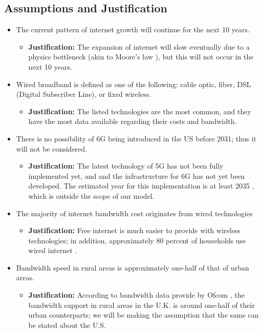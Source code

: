 \documentclass[12pt]{article}
\begin{document}
\subsection{Assumptions and Justification}
\begin{itemize}
    \item The current pattern of internet growth will continue for the next 10 years. 
    \begin{itemize}
        \item \textbf{Justification:} The expansion of internet will slow eventually due to a physics bottleneck (akin to Moore's law \cite{moorelaw}), but this will not occur in the next 10 years.
    \end{itemize}
     \item Wired broadband is defined as one of the following: cable optic, fiber, DSL (Digital Subscriber Line), or fixed wireless.
    \begin{itemize}
        \item \textbf{Justification:} The listed technologies are the most common, and they have the most  data available regarding their costs and bandwidth.
    \end{itemize}
     \item There is no possibility of 6G being introduced in the US before 2031; thus it will not be considered.
     \begin{itemize}
        \item \textbf{Justification:} The latest technology of 5G has not been fully implemented yet, and and the infrastructure for 6G has not yet been developed. The estimated year for this implementation is at least 2035 \cite{sixg}, which is outside the scope of our model. 
    \end{itemize}
     \item The majority of internet bandwidth cost originates from wired technologies
    \begin{itemize}
        \item \textbf{Justification:} Free internet is much easier to provide with wireless technologies; in addition, approximately 80 percent of households use wired internet \cite{wiredinternet}.
    \end{itemize}
     \item Bandwidth speed in rural areas is approximately one-half of that of urban areas.
    \begin{itemize}
        \item \textbf{Justification:} According to bandwidth data provide by Ofcom \cite{ofcom}, the bandwidth support in rural areas in the U.K. is around one-half of their urban counterparts; we will be making the assumption that the same can be stated about the U.S.
    \end{itemize}
\end{itemize}
\end{document}
